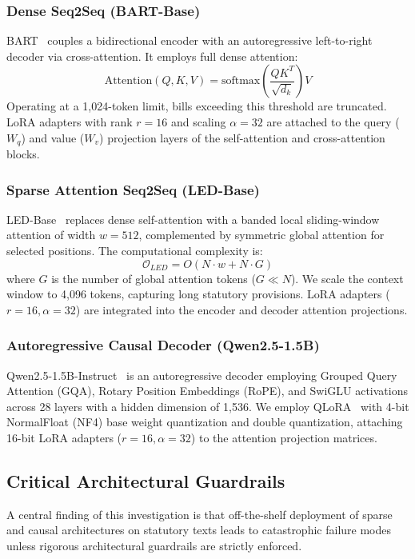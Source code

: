 \documentclass[conference]{IEEEtran}
\begin{document}
\subsubsection{Dense Seq2Seq (BART-Base)}
BART~\cite{lewis2020bart} couples a bidirectional encoder with an autoregressive left-to-right decoder via cross-attention. It employs full dense attention:
\begin{equation}
\text{Attention}(Q, K, V) = \text{softmax}\left(\frac{QK^T}{\sqrt{d_k}}\right)V
\label{eq:full_attn}
\end{equation}
Operating at a 1,024-token limit, bills exceeding this threshold are truncated. LoRA adapters with rank $r=16$ and scaling $\alpha=32$ are attached to the query ($W_q$) and value ($W_v$) projection layers of the self-attention and cross-attention blocks.

\subsubsection{Sparse Attention Seq2Seq (LED-Base)}
LED-Base~\cite{beltagy2020longformer} replaces dense self-attention with a banded local sliding-window attention of width $w=512$, complemented by symmetric global attention for selected positions. The computational complexity is:
\begin{equation}
\mathcal{O}_{LED} = O(N \cdot w + N \cdot G)
\label{eq:led_complexity}
\end{equation}
where $G$ is the number of global attention tokens ($G \ll N$). We scale the context window to 4,096 tokens, capturing long statutory provisions. LoRA adapters ($r=16, \alpha=32$) are integrated into the encoder and decoder attention projections.

\subsubsection{Autoregressive Causal Decoder (Qwen2.5-1.5B)}
Qwen2.5-1.5B-Instruct~\cite{qwen2024} is an autoregressive decoder employing Grouped Query Attention (GQA), Rotary Position Embeddings (RoPE), and SwiGLU activations across 28 layers with a hidden dimension of 1,536. We employ QLoRA~\cite{dettmers2023qlora} with 4-bit NormalFloat (NF4) base weight quantization and double quantization, attaching 16-bit LoRA adapters ($r=16, \alpha=32$) to the attention projection matrices.

\subsection{Critical Architectural Guardrails}
A central finding of this investigation is that off-the-shelf deployment of sparse and causal architectures on statutory texts leads to catastrophic failure modes unless rigorous architectural guardrails are strictly enforced.
\end{document}
